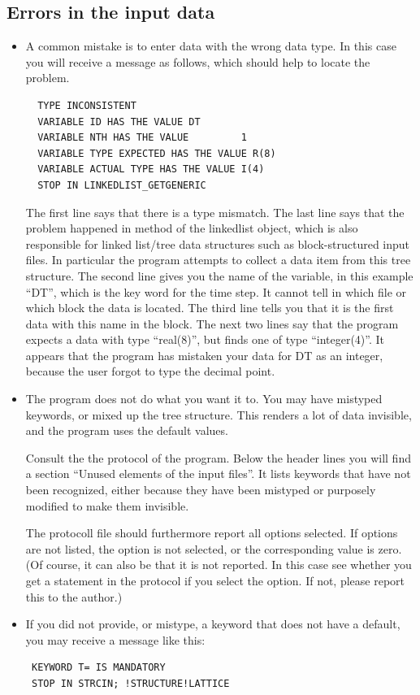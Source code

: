 \documentclass[final,12pt,makeidx,DIV=calc]{article}
\begin{document}
{{{{{{%
\subsection{Errors in the input data}

\begin{itemize}
\item A common mistake is to enter data with the wrong data type.
  In this case you will receive a message as follows, which should help
  to locate the problem.
  \begin{verbatim}
  TYPE INCONSISTENT
  VARIABLE ID HAS THE VALUE DT
  VARIABLE NTH HAS THE VALUE         1
  VARIABLE TYPE EXPECTED HAS THE VALUE R(8)
  VARIABLE ACTUAL TYPE HAS THE VALUE I(4)
  STOP IN LINKEDLIST_GETGENERIC
  \end{verbatim}
  The first line says that there is a type mismatch. The last line
  says that the problem happened in method of the linkedlist object,
  which is also responsible for linked list/tree data structures such
  as block-structured input files. In particular the program attempts
  to collect a data item from this tree structure.  The second line
  gives you the name of the variable, in this example ``DT'', which is
  the key word for the time step. It cannot tell in which file or
  which block the data is located. The third line tells you that it is
  the first data with this name in the block. The next two lines say
  that the program expects a data with type ``real(8)'', but finds one
  of type ``integer(4)''. It appears that the program has mistaken
  your data for DT as an integer, because the user forgot to type the
  decimal point.
%
\item The program does not do what you want it to. You may have mistyped
  keywords, or mixed up the tree structure. This renders a lot of data
  invisible, and the program uses the default values. 

  Consult the the protocol of the program. Below the header lines you
  will find a section ``Unused elements of the input files''. It lists
  keywords that have not been recognized, either because they have been
  mistyped or purposely modified to make them invisible.

  The protocoll file should furthermore report all options selected.
  If options are not listed, the option is not selected, or the
  corresponding value is zero. (Of course, it can also be that it is
  not reported. In this case see whether you get a statement in the
  protocol if you select the option. If not, please report this to the
  author.)
%
\item If you did not provide, or mistype, a keyword that does not have
  a default, you may receive a message like this:
 \begin{verbatim}
 KEYWORD T= IS MANDATORY
 STOP IN STRCIN; !STRUCTURE!LATTICE
 \end{verbatim}


\end{itemize}}}}}}}
\end{document}
